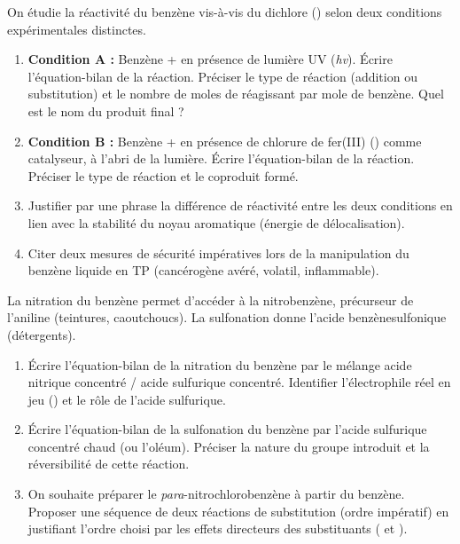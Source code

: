 \documentclass[11pt]{article}
\begin{document}
\begin{exercice}
On étudie la réactivité du benzène vis-à-vis du dichlore () selon deux conditions expérimentales distinctes.
\begin{enumerate}
    \item \textbf{Condition A :} Benzène +  en présence de lumière UV (\textit{hv}). Écrire l'équation-bilan de la réaction. Préciser le type de réaction (addition ou substitution) et le nombre de moles de  réagissant par mole de benzène. Quel est le nom du produit final ?
    \item \textbf{Condition B :} Benzène +  en présence de chlorure de fer(III) () comme catalyseur, à l'abri de la lumière. Écrire l'équation-bilan de la réaction. Préciser le type de réaction et le coproduit formé.
    \item Justifier par une phrase la différence de réactivité entre les deux conditions en lien avec la stabilité du noyau aromatique (énergie de délocalisation).
    \item Citer deux mesures de sécurité impératives lors de la manipulation du benzène liquide en TP (cancérogène avéré, volatil, inflammable).
\end{enumerate}
\end{exercice}

\begin{exercice}
La nitration du benzène permet d'accéder à la nitrobenzène, précurseur de l'aniline (teintures, caoutchoucs). La sulfonation donne l'acide benzènesulfonique (détergents).
\begin{enumerate}
    \item Écrire l'équation-bilan de la nitration du benzène par le mélange acide nitrique concentré / acide sulfurique concentré. Identifier l'électrophile réel en jeu () et le rôle de l'acide sulfurique.
    \item Écrire l'équation-bilan de la sulfonation du benzène par l'acide sulfurique concentré chaud (ou l'oléum). Préciser la nature du groupe introduit et la réversibilité de cette réaction.
    \item On souhaite préparer le \textit{para}-nitrochlorobenzène à partir du benzène. Proposer une séquence de deux réactions de substitution (ordre impératif) en justifiant l'ordre choisi par les effets directeurs des substituants ( et ).
\end{enumerate}
\end{exercice}
\end{document}
